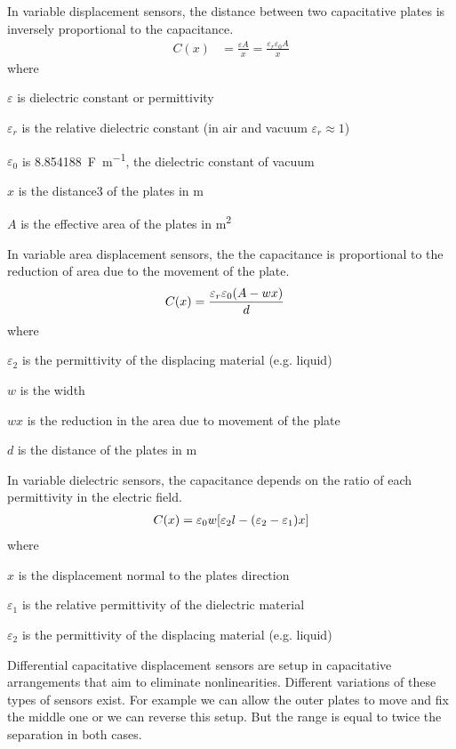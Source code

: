 In variable displacement sensors, the distance between two capacitative plates is inversely proportional to the capacitance.
\begin{align}
    C(x) &= \frac{\varepsilon A}{x} = \frac{\varepsilon_r\varepsilon_0 A}{x}
\end{align}
where
\begin{description}[topsep=0ex, noitemsep]
    \item $\varepsilon$ is dielectric constant or permittivity
    \item $\varepsilon_r$ is the relative dielectric constant (in air and vacuum $\varepsilon_r\approx 1$)
    \item $\varepsilon_0$ is \SI{8.854188}{\farad\per\meter}, the dielectric constant of vacuum
    \item $x$ is the distance3 of the plates in \si{\meter}
    \item $A$ is the effective area of the plates in \si{\meter\squared}
\end{description}

In variable area displacement sensors, the the capacitance is proportional to the reduction of area due to the movement of the plate.
\begin{align}
   C(x) &= \frac{\varepsilon_r\varepsilon_0\pqty{A-wx}}{d}\label{eqn:var_ar_displace}
\end{align}
where
\begin{description}[topsep=0ex, noitemsep]
    \item $\varepsilon_2$ is the permittivity of the displacing material (e.g. liquid)
    \item $w$ is the width
    \item $wx$ is the reduction in the area due to movement of the plate 
    \item $d$ is the distance of the plates in \si{\meter}
\end{description}

In variable dielectric sensors, the capacitance depends on the ratio of each permittivity in the electric field.
\begin{align}
   C(x) &= \varepsilon_0 w \bqty{\varepsilon_2 l - \pqty{\varepsilon_2-\varepsilon_1}x}\label{eqn:var_diel_displace}\\
\end{align}
where
\begin{description}[topsep=0ex, noitemsep]
    \item $x$ is the displacement normal to the plates direction
    \item $\varepsilon_1$ is the relative permittivity of the dielectric material
    \item $\varepsilon_2$ is the permittivity of the displacing material (e.g. liquid)
\end{description}
Differential capacitative displacement sensors are setup in capacitative arrangements that aim to eliminate nonlinearities. Different variations of these types of sensors exist. For example we can allow the outer plates to move and fix the middle one or we can reverse this setup. But the range is equal to twice the separation in both cases.

